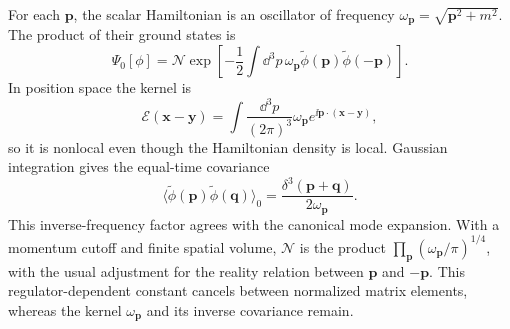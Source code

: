 \begin{enumerate}
For each \(\mathbf p\), the scalar Hamiltonian is an oscillator of frequency
\(\omega_{\mathbf p}=\sqrt{\mathbf p^2+m^2}\).  The product of their ground
states is
\[
 \Psi_0[\phi]=\mathcal N
 \exp\left[-\frac12\int \dd^3p\,
 \omega_{\mathbf p}\widetilde\phi(\mathbf p)
 \widetilde\phi(-\mathbf p)\right].
\]
In position space the kernel is
\[
 \mathcal E(\mathbf x-\mathbf y)=
 \int\frac{\dd^3p}{(2\pi)^3}
 \omega_{\mathbf p}e^{\ii\mathbf p\cdot(\mathbf x-\mathbf y)},
\]
so it is nonlocal even though the Hamiltonian density is local.  Gaussian
integration gives the equal-time covariance
\[
 \langle\widetilde\phi(\mathbf p)
 \widetilde\phi(\mathbf q)\rangle_0
 =\frac{\delta^3(\mathbf p+\mathbf q)}{2\omega_{\mathbf p}}.
\]
This inverse-frequency factor agrees with the canonical mode expansion.
With a momentum cutoff and finite spatial volume,
\(\mathcal N\) is the product
\(\prod_{\mathbf p}(\omega_{\mathbf p}/\pi)^{1/4}\), with the usual adjustment
for the reality relation between \(\mathbf p\) and \(-\mathbf p\).  This
regulator-dependent constant cancels between normalized matrix elements,
whereas the kernel \(\omega_{\mathbf p}\) and its inverse covariance remain.


\end{enumerate}
